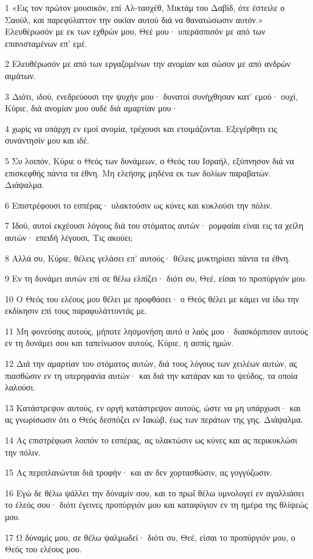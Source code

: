\par 1 «Εις τον πρώτον μουσικόν, επί Αλ-τασχέθ, Μικτάμ του Δαβίδ, ότε έστειλε ο Σαούλ, και παρεφύλαττον την οικίαν αυτού διά να θανατώσωσιν αυτόν.» Ελευθέρωσόν με εκ των εχθρών μου, Θεέ μου· υπεράσπισόν με από των επανισταμένων επ' εμέ.
\par 2 Ελευθέρωσόν με από των εργαζομένων την ανομίαν και σώσον με από ανδρών αιμάτων.
\par 3 Διότι, ιδού, ενεδρεύουσι την ψυχήν μου· δυνατοί συνήχθησαν κατ' εμού· ουχί, Κύριε, διά ανομίαν μου ουδέ διά αμαρτίαν μου·
\par 4 χωρίς να υπάρχη εν εμοί ανομία, τρέχουσι και ετοιμάζονται. Εξεγέρθητι εις συνάντησίν μου και ιδέ.
\par 5 Συ λοιπόν, Κύριε ο Θεός των δυνάμεων, ο Θεός του Ισραήλ, εξύπνησον διά να επισκεφθής πάντα τα έθνη. Μη ελεήσης μηδένα εκ των δολίων παραβατών. Διάψαλμα.
\par 6 Επιστρέφουσι το εσπέρας· υλακτούσιν ως κύνες και κυκλούσι την πόλιν.
\par 7 Ιδού, αυτοί εκχέουσι λόγους διά του στόματος αυτών· ρομφαίαι είναι εις τα χείλη αυτών· επειδή λέγουσι, Τις ακούει;
\par 8 Αλλά συ, Κύριε, θέλεις γελάσει επ' αυτούς· θέλεις μυκτηρίσει πάντα τα έθνη.
\par 9 Εν τη δυνάμει αυτών επί σε θέλω ελπίζει· διότι συ, Θεέ, είσαι το προπύργιόν μου.
\par 10 Ο Θεός του ελέους μου θέλει με προφθάσει· ο Θεός θέλει με κάμει να ίδω την εκδίκησιν επί τους παραφυλάττοντάς με.
\par 11 Μη φονεύσης αυτούς, μήποτε λησμονήση αυτό ο λαός μου· διασκόρπισον αυτούς εν τη δυνάμει σου και ταπείνωσον αυτούς, Κύριε, η ασπίς ημών.
\par 12 Διά την αμαρτίαν του στόματος αυτών, διά τους λόγους των χειλέων αυτών, ας πιασθώσιν εν τη υπερηφανία αυτών· και διά την κατάραν και το ψεύδος, τα οποία λαλούσι.
\par 13 Κατάστρεψον αυτούς, εν οργή κατάστρεψον αυτούς, ώστε να μη υπάρχωσι· και ας γνωρίσωσιν ότι ο Θεός δεσπόζει εν Ιακώβ, έως των περάτων της γης. Διάψαλμα.
\par 14 Ας επιστρέφωσι λοιπόν το εσπέρας, ας υλακτώσιν ως κύνες και ας περικυκλώσι την πόλιν.
\par 15 Ας περιπλανώνται διά τροφήν· και αν δεν χορτασθώσιν, ας γογγύζωσιν.
\par 16 Εγώ δε θέλω ψάλλει την δύναμίν σου, και το πρωΐ θέλω υμνολογεί εν αγαλλιάσει το έλεός σου· διότι έγεινες προπύργιόν μου και καταφύγιον εν τη ημέρα της θλίψεώς μου.
\par 17 Ω δύναμίς μου, σε θέλω ψαλμωδεί· διότι συ, Θεέ, είσαι το προπύργιόν μου, ο Θεός του ελέους μου.

